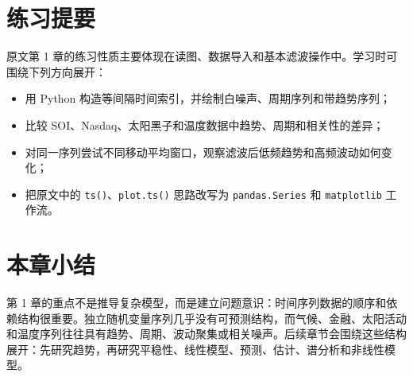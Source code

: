 \documentclass[11pt,a4paper]{ctexart}
\begin{document}
\section{练习提要}

原文第 1 章的练习性质主要体现在读图、数据导入和基本滤波操作中。学习时可围绕下列方向展开：
\begin{itemize}
  \item 用 Python 构造等间隔时间索引，并绘制白噪声、周期序列和带趋势序列；
  \item 比较 SOI、Nasdaq、太阳黑子和温度数据中趋势、周期和相关性的差异；
  \item 对同一序列尝试不同移动平均窗口，观察滤波后低频趋势和高频波动如何变化；
  \item 把原文中的 \texttt{ts()}、\texttt{plot.ts()} 思路改写为 \texttt{pandas.Series} 和 \texttt{matplotlib} 工作流。
\end{itemize}

\section*{本章小结}

第 1 章的重点不是推导复杂模型，而是建立问题意识：时间序列数据的顺序和依赖结构很重要。独立随机变量序列几乎没有可预测结构，而气候、金融、太阳活动和温度序列往往具有趋势、周期、波动聚集或相关噪声。后续章节会围绕这些结构展开：先研究趋势，再研究平稳性、线性模型、预测、估计、谱分析和非线性模型。
\end{document}
